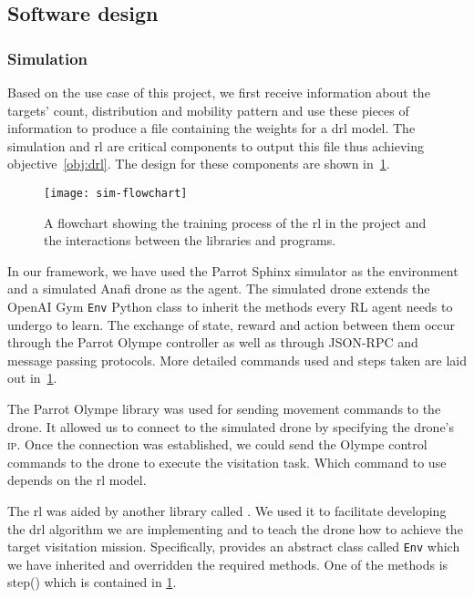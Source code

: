\documentclass[../main.tex]{subfiles}
\begin{document}
\subsection{Software design}

\subsubsection{Simulation}
Based on the use case of this project, we first receive information
about the targets' count, distribution and mobility pattern and use
these pieces of
information to produce a file containing the weights for a \gls{drl}
model.
The simulation and \gls{rl} are critical
components to output this file thus achieving objective~\ref{obj:drl}.
The design for these components are shown in~\cref{fig:sim-flowchart}.

\begin{figure}[p]
    \centering
    \texttt{[image: sim-flowchart]}
    \caption{A flowchart showing the training process
        of the \gls{rl} in the project
        and the interactions between the libraries
        and programs.}
    \label{fig:sim-flowchart}
\end{figure}

In our framework, we have used the Parrot Sphinx simulator
as the environment and a simulated Anafi drone as the agent.
The simulated drone extends the OpenAI Gym \texttt{Env} 
Python class
to inherit the methods every RL agent
needs to undergo to learn.
The exchange of state, reward and action between them 
occur through the Parrot Olympe controller as well as
through JSON-RPC and message passing protocols.
More detailed commands used and steps taken are laid out 
in~\cref{fig:sim-flowchart}.

The Parrot Olympe library was used for sending movement commands to
the drone.
It allowed us to connect
to the simulated drone by specifying the drone's
\textsc{ip}. Once the connection was established, 
we could send the Olympe control commands to the drone
to execute the visitation task. 
Which command to use
depends on the \gls{rl} model.

The \gls{rl} was aided 
by another library called \gym.
We used it to facilitate developing the
\gls{drl} algorithm we are implementing and to 
teach the drone how to achieve the 
target visitation mission.
Specifically, \gym provides an abstract class 
called \texttt{Env}
which we have inherited and overridden the 
required methods.
One of the methods is step() which is contained in
\cref{fig:sim-flowchart}.
\end{document}
